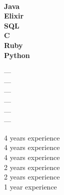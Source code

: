 \documentclass[9pt]{developercv} %
\begin{document}
\begin{minipage}[t]{0.45\textwidth} %
	\vspace{-\baselineskip} %
	\\
	\begin{minipage}[t]{0.3\textwidth}
		\large\textbf{Java}\\
		\large\textbf{Elixir}\\
		\large\textbf{SQL}\\
		\large\textbf{C}\\
		\large\textbf{Ruby}\\
		\large\textbf{Python}
	\end{minipage}
	\hfill
	\begin{minipage}[t]{0.05\textwidth}
		\large---\\
		---\\
		---\\
		---\\
		---\\
		---
	\end{minipage}
	\hfill
	\begin{minipage}[t]{0.6\textwidth}
		\large4 years experience\\
		4 years experience\\
		4 years experience\\
		2 years experience\\
		2 years experience\\
		1 year experience
	\end{minipage}
\end{minipage}


\end{document}
